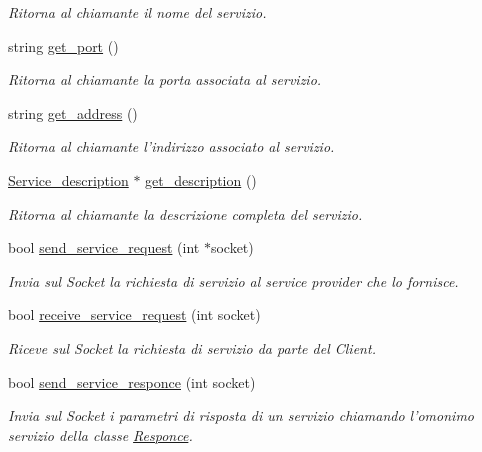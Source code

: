 \begin{DoxyCompactItemize}
\begin{DoxyCompactList}\small\item\em Ritorna al chiamante il nome del servizio. \end{DoxyCompactList}\item 
string \hyperlink{class_service_acc2d27605b7e2e45d28c6c18c117ee48}{get\-\_\-port} ()
\begin{DoxyCompactList}\small\item\em Ritorna al chiamante la porta associata al servizio. \end{DoxyCompactList}\item 
string \hyperlink{class_service_a4255bff226f0c507ed997d8474426cff}{get\-\_\-address} ()
\begin{DoxyCompactList}\small\item\em Ritorna al chiamante l'indirizzo associato al servizio. \end{DoxyCompactList}\item 
\hyperlink{struct_service__description}{Service\-\_\-description} $\ast$ \hyperlink{class_service_aa3b79916f4e6f1be8e8189fc1a6b02ad}{get\-\_\-description} ()
\begin{DoxyCompactList}\small\item\em Ritorna al chiamante la descrizione completa del servizio. \end{DoxyCompactList}\item 
bool \hyperlink{class_service_a4952a5f82a2c49a83fe5548c3865458b}{send\-\_\-service\-\_\-request} (int $\ast$socket)
\begin{DoxyCompactList}\small\item\em Invia sul {\itshape Socket} la richiesta di servizio al service provider che lo fornisce. \end{DoxyCompactList}\item 
bool \hyperlink{class_service_a67f01dff03c913cd0ba77cf073e829fd}{receive\-\_\-service\-\_\-request} (int socket)
\begin{DoxyCompactList}\small\item\em Riceve sul {\itshape Socket} la richiesta di servizio da parte del {\itshape Client}. \end{DoxyCompactList}\item 
bool \hyperlink{class_service_a4efee47181b839b6e03146a439f924db}{send\-\_\-service\-\_\-responce} (int socket)
\begin{DoxyCompactList}\small\item\em Invia sul {\itshape Socket} i parametri di risposta di un servizio chiamando l'omonimo servizio della classe {\ttfamily \hyperlink{class_responce}{Responce}}. \end{DoxyCompactList}\item 

\end{DoxyCompactItemize}
